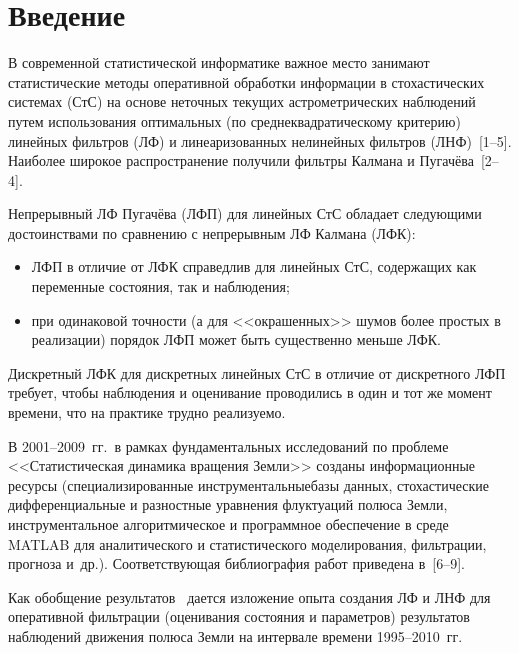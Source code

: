 
      \thispagestyle{headings}

      \begin{multicols}{2}

      \label{st\stat}

\section{Введение}

В современной статистической информатике важное место занимают статистические методы оперативной 
обработки информации в стохастических системах (СтС) на основе неточных текущих астрометрических 
наблюдений путем использования оптимальных (по среднеквадратическому критерию) линейных фильтров 
(ЛФ) и линеаризованных нелинейных фильтров (ЛНФ)~[1--5]. Наиболее широкое распространение получили 
фильтры Калмана и Пугачёва~[2--4].

Непрерывный ЛФ Пугачёва (ЛФП) для линейных СтС обладает следующими достоинствами 
по сравнению с непрерывным ЛФ Калмана (ЛФК):
\begin{itemize}
\item
 ЛФП в отличие от ЛФК справедлив для линейных СтС, содержащих как переменные состояния, так и наблюдения;
\item
 при одинаковой точности (а для <<окрашенных>> шумов более простых в реализации) порядок ЛФП 
 может быть существенно меньше ЛФК.
 \end{itemize}

Дискретный ЛФК для дискретных линейных СтС в отличие  от дискретного ЛФП требует, чтобы наблюдения 
и оценивание проводились в один и тот же момент времени, что на практике трудно реализуемо.

В 2001--2009~гг.\ в рамках фундаментальных исследований по проблеме <<Статистическая динамика вращения Земли>> 
созданы информационные ресурсы (специализированные инструментальные\linebreak базы данных, стохастические дифференциальные 
и разностные уравнения флуктуаций полюса Земли, инструментальное алгоритмическое и  программное обеспечение в 
среде MATLAB для аналитического и статистического моделирования, фильтрации, прогноза и~др.). Соответствующая 
библиография работ приведена в~[6--9].

Как обобщение результатов~\cite{4sin, 5sin} дается изложение опыта создания ЛФ и ЛНФ 
для оперативной фильтрации (оценивания состояния и параметров) результатов наблюдений 
движения полюса Земли на интервале времени 1995--2010~гг.


\end{multicols}
